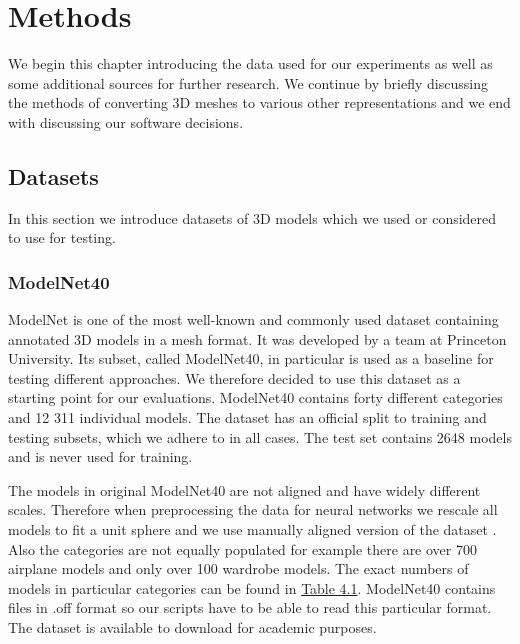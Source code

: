 \chapter{Methods}
\label{sec:chap4}
We begin this chapter introducing the data used for our experiments as well as some additional sources for further research. We continue by briefly discussing the methods of converting 3D meshes to various other representations and we end with discussing our software decisions.

\section{Datasets}
In this section we introduce datasets of 3D models which we used or considered to use for testing.

\subsection{ModelNet40}
ModelNet \cite{wu_3d_2014} is one of the most well-known and commonly used dataset containing annotated 3D models in a mesh format. It was developed by a team at Princeton University. Its subset, called ModelNet40, in particular is used as a baseline for testing different approaches. We therefore decided to use this dataset as a starting point for our evaluations. ModelNet40 contains forty different categories and 12 311 individual models. The dataset has an official split to training and testing subsets, which we adhere to in all cases. The test set contains 2648 models and is never used for training. \par
The models in original ModelNet40 are not aligned and have widely different scales. Therefore when preprocessing the data for neural networks we rescale all models to fit a  unit sphere and we use manually aligned version of the dataset \cite{sedaghat_orientation-boosted_2016}. Also the categories are not equally populated for example there are over 700 airplane models and only over 100 wardrobe models. The exact numbers of models in particular categories can be found in \hyperref[Table:modelnetcats]{Table 4.1}. ModelNet40 contains files in .off format so our scripts have to be able to read this particular format. The dataset is available to download for academic purposes.




